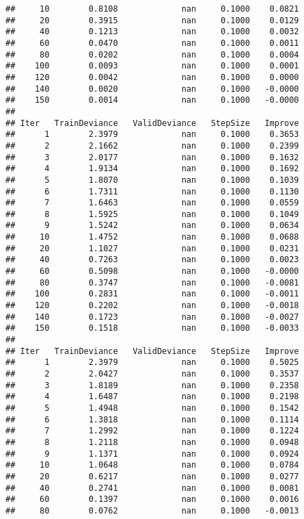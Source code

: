 \documentclass[]{article}
\begin{document}
\begin{verbatim}
##     10        0.8108             nan     0.1000    0.0821
##     20        0.3915             nan     0.1000    0.0129
##     40        0.1213             nan     0.1000    0.0032
##     60        0.0470             nan     0.1000    0.0011
##     80        0.0202             nan     0.1000    0.0004
##    100        0.0093             nan     0.1000    0.0001
##    120        0.0042             nan     0.1000    0.0000
##    140        0.0020             nan     0.1000   -0.0000
##    150        0.0014             nan     0.1000   -0.0000
## 
## Iter   TrainDeviance   ValidDeviance   StepSize   Improve
##      1        2.3979             nan     0.1000    0.3653
##      2        2.1662             nan     0.1000    0.2399
##      3        2.0177             nan     0.1000    0.1632
##      4        1.9134             nan     0.1000    0.1692
##      5        1.8070             nan     0.1000    0.1039
##      6        1.7311             nan     0.1000    0.1130
##      7        1.6463             nan     0.1000    0.0559
##      8        1.5925             nan     0.1000    0.1049
##      9        1.5242             nan     0.1000    0.0634
##     10        1.4752             nan     0.1000    0.0688
##     20        1.1027             nan     0.1000    0.0231
##     40        0.7263             nan     0.1000    0.0023
##     60        0.5098             nan     0.1000   -0.0000
##     80        0.3747             nan     0.1000   -0.0081
##    100        0.2831             nan     0.1000   -0.0011
##    120        0.2202             nan     0.1000   -0.0018
##    140        0.1723             nan     0.1000   -0.0027
##    150        0.1518             nan     0.1000   -0.0033
## 
## Iter   TrainDeviance   ValidDeviance   StepSize   Improve
##      1        2.3979             nan     0.1000    0.5025
##      2        2.0427             nan     0.1000    0.3537
##      3        1.8189             nan     0.1000    0.2358
##      4        1.6487             nan     0.1000    0.2198
##      5        1.4948             nan     0.1000    0.1542
##      6        1.3818             nan     0.1000    0.1114
##      7        1.2992             nan     0.1000    0.1224
##      8        1.2118             nan     0.1000    0.0948
##      9        1.1371             nan     0.1000    0.0924
##     10        1.0648             nan     0.1000    0.0784
##     20        0.6217             nan     0.1000    0.0277
##     40        0.2741             nan     0.1000    0.0081
##     60        0.1397             nan     0.1000    0.0016
##     80        0.0762             nan     0.1000   -0.0013

\end{verbatim}
\end{document}
